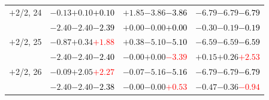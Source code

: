 \documentclass[compress]{beamer}
\begin{document}
\begin{frame}
\begin{tabular}{r | c | c | c}
$+$2/2, 24 & $-0.13$\hspace{0.1 cm}$+0.10$\hspace{0.1 cm}\textcolor{black}{$+0.10$} & $+1.85$\hspace{0.1 cm}$-3.86$\hspace{0.1 cm}\textcolor{black}{$-3.86$} & $-6.79$\hspace{0.1 cm}$-6.79$\hspace{0.1 cm}\textcolor{black}{$-6.79$} \\
           & $-2.40$\hspace{0.1 cm}$-2.40$\hspace{0.1 cm}\textcolor{black}{$-2.39$} & $+0.00$\hspace{0.1 cm}$-0.00$\hspace{0.1 cm}\textcolor{black}{$+0.00$} & $-0.30$\hspace{0.1 cm}$-0.19$\hspace{0.1 cm}\textcolor{black}{$-0.19$} \\
$+$2/2, 25 & $-0.87$\hspace{0.1 cm}$+0.34$\hspace{0.1 cm}\textcolor{red}{$+1.88$} & $+0.38$\hspace{0.1 cm}$-5.10$\hspace{0.1 cm}\textcolor{black}{$-5.10$} & $-6.59$\hspace{0.1 cm}$-6.59$\hspace{0.1 cm}\textcolor{black}{$-6.59$} \\
           & $-2.40$\hspace{0.1 cm}$-2.40$\hspace{0.1 cm}\textcolor{black}{$-2.40$} & $-0.00$\hspace{0.1 cm}$+0.00$\hspace{0.1 cm}\textcolor{red}{$-3.39$} & $+0.15$\hspace{0.1 cm}$+0.26$\hspace{0.1 cm}\textcolor{red}{$+2.53$} \\
$+$2/2, 26 & $-0.09$\hspace{0.1 cm}$+2.05$\hspace{0.1 cm}\textcolor{red}{$+2.27$} & $-0.07$\hspace{0.1 cm}$-5.16$\hspace{0.1 cm}\textcolor{black}{$-5.16$} & $-6.79$\hspace{0.1 cm}$-6.79$\hspace{0.1 cm}\textcolor{black}{$-6.79$} \\
           & $-2.40$\hspace{0.1 cm}$-2.40$\hspace{0.1 cm}\textcolor{black}{$-2.38$} & $-0.00$\hspace{0.1 cm}$-0.00$\hspace{0.1 cm}\textcolor{red}{$+0.53$} & $-0.47$\hspace{0.1 cm}$-0.36$\hspace{0.1 cm}\textcolor{red}{$-0.94$} \\

\end{tabular}
\end{frame}
\end{document}
